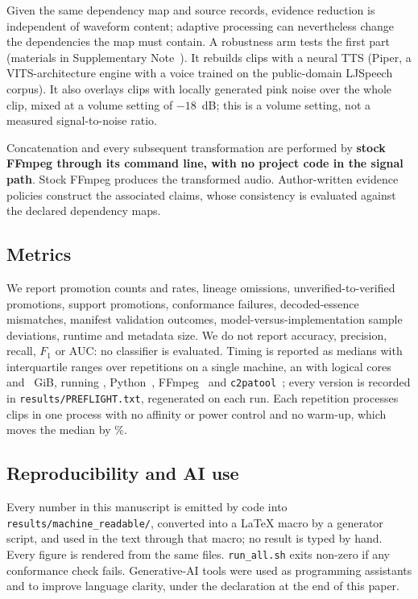 \documentclass[preprint,3p,11pt,authoryear]{elsarticle}
\begin{document}
Given the same dependency map and source records, evidence reduction is
independent of waveform content; adaptive processing can nevertheless change the
dependencies the map must contain. A robustness arm tests the first part
(materials in Supplementary Note~\NoteRobustness{}). It rebuilds \CtwoNeuralN{} clips with a neural TTS
(Piper, a VITS-architecture engine with a voice trained on the public-domain
LJSpeech corpus). It also overlays \CtwoNoiseN{} clips with locally generated pink
noise over the whole clip, mixed at a volume setting of $-18$~dB; this
is a volume setting, not a measured signal-to-noise ratio.

Concatenation and every subsequent transformation are performed by
\textbf{stock FFmpeg through its command line, with no project code in the
signal path}. Stock FFmpeg produces the transformed audio. Author-written
evidence policies construct the associated claims, whose consistency is
evaluated against the declared dependency maps.

\subsection{Metrics}

We report promotion counts and rates, lineage omissions, unverified-to-verified
promotions, support promotions, conformance failures, decoded-essence
mismatches, manifest validation outcomes, model-versus-implementation sample
deviations, runtime and metadata size. We do not report accuracy,
precision, recall, $F_1$ or AUC: no classifier is evaluated. Timing is
reported as medians with interquartile ranges over \Greps{} repetitions on a
single machine, an \Vcpu{} with \Vcores{} logical cores and \Vram{}~GiB,
running \Vos{}, Python~\Vpython{}, FFmpeg~\Vffmpeg{} and
\texttt{c2patool}~\VcTwopatool{}; every version is recorded in
\texttt{results/PREFLIGHT.txt}, regenerated on each run. Each repetition processes \Gclips{} clips in one process with no affinity or
power control and no warm-up, which moves the median by \GfirstIterPct{}\%.

\subsection{Reproducibility and AI use}

Every number in this manuscript is emitted by code into
\texttt{results/machine\_readable/}, converted into a LaTeX macro by a
generator script, and used in the text through that macro; no result is typed by
hand. Every figure is rendered from the same files. \texttt{run\_all.sh} exits
non-zero if any conformance check fails. Generative-AI tools were used as
programming assistants and to improve language clarity, under the declaration at the end of this
paper.
\end{document}
